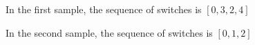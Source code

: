 In the first sample, the sequence of switches is $[0,3,2,4]$

In the second sample, the sequence of switches is $[0,1,2]$